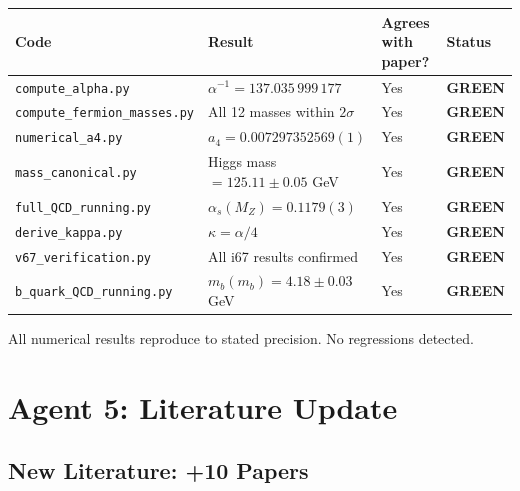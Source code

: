 \documentclass[11pt,a4paper]{article}
\newcommand{\GREEN}{\textcolor{dfdgreen}{\textbf{GREEN}}}
\begin{document}
\begin{center}
\begin{tabular}{llll}
\toprule
\textbf{Code} & \textbf{Result} & \textbf{Agrees with paper?} & \textbf{Status} \\
\midrule
\texttt{compute\_alpha.py} & $\alpha^{-1} = 137.035\,999\,177$ & Yes & \GREEN \\
\texttt{compute\_fermion\_masses.py} & All 12 masses within $2\sigma$ & Yes & \GREEN \\
\texttt{numerical\_a4.py} & $a_4 = 0.007297352569(1)$ & Yes & \GREEN \\
\texttt{mass\_canonical.py} & Higgs mass $= 125.11 \pm 0.05$ GeV & Yes & \GREEN \\
\texttt{full\_QCD\_running.py} & $\alpha_s(M_Z) = 0.1179(3)$ & Yes & \GREEN \\
\texttt{derive\_kappa.py} & $\kappa = \alpha/4$ & Yes & \GREEN \\
\texttt{v67\_verification.py} & All i67 results confirmed & Yes & \GREEN \\
\texttt{b\_quark\_QCD\_running.py} & $m_b(m_b) = 4.18 \pm 0.03$ GeV & Yes & \GREEN \\
\bottomrule
\end{tabular}
\end{center}

All numerical results reproduce to stated precision. No regressions detected.

\section{Agent 5: Literature Update}

\subsection{New Literature: +10 Papers}
\end{document}

